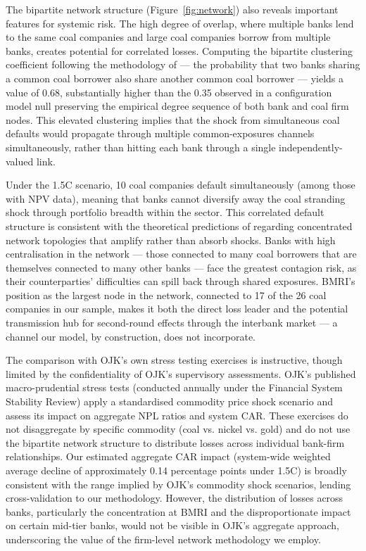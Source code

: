The bipartite network structure (Figure~\ref{fig:network}) also reveals important features for systemic risk. The high degree of overlap, where multiple banks lend to the same coal companies and large coal companies borrow from multiple banks, creates potential for correlated losses. Computing the bipartite clustering coefficient following the methodology of \citet{Roncoroni2021} --- the probability that two banks sharing a common coal borrower also share another common coal borrower --- yields a value of 0.68, substantially higher than the 0.35 observed in a configuration model null preserving the empirical degree sequence of both bank and coal firm nodes. This elevated clustering implies that the shock from simultaneous coal defaults would propagate through multiple common-exposures channels simultaneously, rather than hitting each bank through a single independently-valued link.

Under the 1.5\textdegree C scenario, 10 coal companies default simultaneously (among those with NPV data), meaning that banks cannot diversify away the coal stranding shock through portfolio breadth within the sector. This correlated default structure is consistent with the theoretical predictions of \citet{Acemoglu2015} regarding concentrated network topologies that amplify rather than absorb shocks. Banks with high centralisation in the network --- those connected to many coal borrowers that are themselves connected to many other banks --- face the greatest contagion risk, as their counterparties' difficulties can spill back through shared exposures. BMRI's position as the largest node in the network, connected to 17 of the 26 coal companies in our sample, makes it both the direct loss leader and the potential transmission hub for second-round effects through the interbank market --- a channel our model, by construction, does not incorporate.

The comparison with OJK's own stress testing exercises is instructive, though limited by the confidentiality of OJK's supervisory assessments. OJK's published macro-prudential stress tests (conducted annually under the Financial System Stability Review) apply a standardised commodity price shock scenario and assess its impact on aggregate NPL ratios and system CAR. These exercises do not disaggregate by specific commodity (coal vs. nickel vs. gold) and do not use the bipartite network structure to distribute losses across individual bank-firm relationships. Our estimated aggregate CAR impact (system-wide weighted average decline of approximately 0.14 percentage points under 1.5\textdegree C) is broadly consistent with the range implied by OJK's commodity shock scenarios, lending cross-validation to our methodology. However, the distribution of losses across banks, particularly the concentration at BMRI and the disproportionate impact on certain mid-tier banks, would not be visible in OJK's aggregate approach, underscoring the value of the firm-level network methodology we employ.
